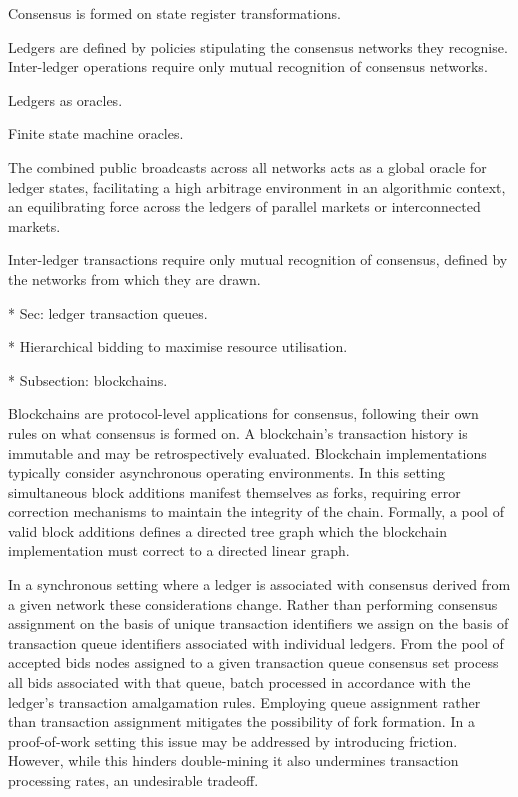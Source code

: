 Consensus is formed on state register transformations.

Ledgers are defined by policies stipulating the consensus networks they recognise. Inter-ledger operations require only mutual recognition of consensus networks.

Ledgers as oracles.

Finite state machine oracles.

The combined public broadcasts across all networks acts as a global oracle for ledger states, facilitating a high arbitrage environment in an algorithmic context, an equilibrating force across the ledgers of parallel markets or interconnected markets.

Inter-ledger transactions require only mutual recognition of consensus, defined by the networks from which they are drawn.

* Sec: ledger transaction queues.

* Hierarchical bidding to maximise resource utilisation.

* Subsection: blockchains.

Blockchains are protocol-level applications for consensus, following their own rules on what consensus is formed on. A blockchain's transaction history is immutable and may be retrospectively evaluated. Blockchain implementations typically consider asynchronous operating environments. In this setting simultaneous block additions manifest themselves as forks, requiring error correction mechanisms to maintain the integrity of the chain. Formally, a pool of valid block additions defines a directed tree graph which the blockchain implementation must correct to a directed linear graph.

In a synchronous setting where a ledger is associated with consensus derived from a given network these considerations change. Rather than performing consensus assignment on the basis of unique transaction identifiers we assign on the basis of transaction queue identifiers associated with individual ledgers. From the pool of accepted bids nodes assigned to a given transaction queue consensus set process all bids associated with that queue, batch processed in accordance with the ledger's transaction amalgamation rules. Employing queue assignment rather than transaction assignment mitigates the possibility of fork formation. In a proof-of-work setting this issue may be addressed by introducing friction. However, while this hinders double-mining it also undermines transaction processing rates, an undesirable tradeoff.

